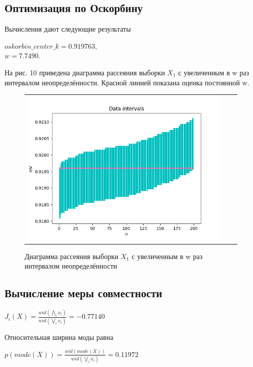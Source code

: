 \documentclass[a4paper,14pt]{article}
\begin{document}
	\subsection{Оптимизация по Оскорбину}
	Вычисления дают следующие результаты\\
	\begin{center}
		$oskorbin\_center\_k = 0.919763,$\\
		$w = 7.7490.$
	\end{center}
	На рис. 10 приведена диаграмма рассеяния выборки $X_1$ с увеличенным в w
	раз интервалом неопределённости.
	Красной линией показана оценка постоянной w.
	\begin{figure}[H]
		\begin{center}
			\begin{tabular}{ccc}
				\includegraphics[scale=0.8]{../image/data_and_intervals3.png}
			\end{tabular}
		\end{center}
		\caption{ Диаграмма рассеяния выборки $X_1$ с увеличенным в w раз интервалом неопределённости} 
	\end{figure}
	\subsection{Вычисление меры совместности}
	\begin{center}
		$J_i (X) = \frac{wid(\bigwedge_{i} x_i)}{wid(\bigvee_i x_i)} = -0.77140$
	\end{center}
	Относительная ширина моды равна\\
	\begin{center}
		$p(mode(X)) = \frac{wid(mode(X))}{wid(\bigvee_i x_i)} = 0.11972$
	\end{center}
	
\end{document}
